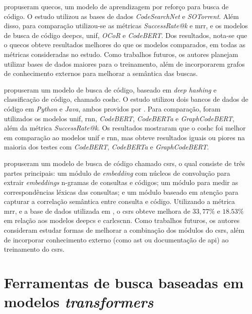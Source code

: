 \textcite{Wang2022EnrichingQS} propuseram \gls{quecos}, um modelo de aprendizagem por reforço para busca de código. O estudo utilizou as bases de dados \textit{CodeSearchNet} \cite{Husain2019CodeSearchNetCE} e \textit{SOTorrent}. Além disso, para comparação utilizou-se as métricas \textit{SuccessRate@k} e \gls{mrr}, e os modelos de busca de código \gls{deepcs}, \gls{unif}, \textit{OCoR} e \textit{CodeBERT}. Dos resultados, nota-se que o \gls{quecos} obteve resultados melhores do que os modelos comparados, em todas as métricas consideradas no estudo. Como trabalhos futuros, os autores planejam utilizar bases de dados maiores para o treinamento, além de incorporarem grafos de conhecimento externos para melhorar a semântica das buscas.

\textcite{Gu2022AcceleratingCS} propuseram um modelo de busca de código, baseado em \textit{deep hashing} e classificação de código, chamado \gls{coshc}. O estudo utilizou dois bancos de dados de código em \textit{Python} e \textit{Java}, ambos providos por \cite{Feng2020CodeBERTAP}. Para comparação, foram utilizados os modelos \gls{unif}, \gls{rnn}, \textit{CodeBERT}, \textit{CodeBERTa} e \textit{GraphCodeBERT}, além da métrica \textit{SuccessRate@k}. Os resultados mostraram que o \gls{coshc} foi melhor em comparação ao modelos \gls{unif} e \gls{rnn}, mas obteve resultados iguais ou piores na maioria dos testes com \textit{CodeBERT}, \textit{CodeBERTa} e \textit{GraphCodeBERT}.

\textcite{Cheng2022CSRSCS} propuseram um modelo de busca de código chamado \gls{csrs}, o qual consiste de três partes principais: um módulo de \textit{embedding} com núcleos de convolução para extrair \textit{embeddings} n-gramas de consultas e códigos; um módulo para medir as correspondências léxicas das consultas; e um módulo baseado em atenção para capturar a correlação semântica entre consulta e código. Utilizando a métrica \gls{mrr}, e a base de dados utilizada em \cite{Gu2018DeepCS}, o \gls{csrs} obteve melhora de $33,77\%$ e $18.53\%$ em relação aos modelos \gls{deepcs} e \gls{carlcscnn}. Como trabalhos futuros, os autores consideram estudar formas de melhorar a combinação dos módulos do \gls{csrs}, além de incorporar conhecimento externo (como \gls{ast} ou documentação de \gls{api}) ao treinamento do \gls{csrs}.

\section{Ferramentas de busca baseadas em modelos \textit{transformers}}
\label{chp:relatedWorks:sec:csToolsTransformers} 

